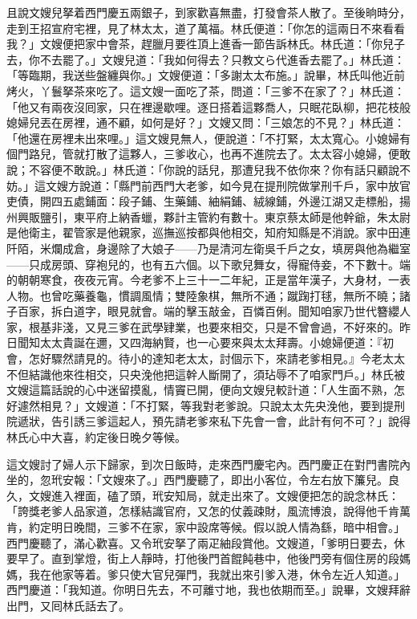 且說文嫂兒拏着西門慶五兩銀子，到家歡喜無盡，打發會茶人散了。至後晌時分，走到王招宣府宅裡，見了林太太，道了萬福。林氏便道：「你怎的這兩日不來看看我？」文嫂便把家中會茶，趕臘月要徃頂上進香一節告訴林氏。林氏道：「你兒子去，你不去罷了。」文嫂兒道：「我如何得去？只教文ら代進香去罷了。」林氏道：「等臨期，我送些盤纏與你。」文嫂便道：「多謝太太布施。」說畢，林氏叫他近前烤火，丫鬟拏茶來吃了。這文嫂一面吃了茶，問道：「三爹不在家了？」林氏道：「他又有兩夜沒囘家，只在裡邊歇哩。逐日搭着這夥喬人，只眠花臥柳，把花枝般媳婦兒丟在房裡，通不顧，如何是好？」文嫂又問：「三娘怎的不見？」林氏道：「他還在房裡未出來哩。」這文嫂見無人，便說道：「不打緊，太太寬心。小媳婦有個門路兒，管就打散了這夥人，三爹收心，也再不進院去了。太太容小媳婦，便敢說；不容便不敢說。」{}林氏道：「你說的話兒，那遭兒我不依你來？你有話只顧說不妨。」這文嫂方說道：「縣門前西門大老爹，如今見在提刑院做掌刑千戶，家中放官吏債，開四五處鋪面：段子鋪、生藥鋪、紬絹鋪、絨線鋪，外邊江湖又走標船，揚州興販鹽引，東平府上納香蠟，夥計主管約有數十。東京蔡太師是他幹爺，朱太尉是他衛主，翟管家是他親家，巡撫巡按都與他相交，知府知縣是不消說。家中田連阡陌，米爛成倉{}，身邊除了大娘子——乃是清河左衛吳千戶之女，填房與他為繼室——只成房頭、穿袍兒的，也有五六個。以下歌兒舞女，得寵侍妾，不下數十。端的朝朝寒食，夜夜元宵。今老爹不上三十一二年紀，正是當年漢子，大身材，一表人物。也曾吃藥養龜，慣調風情；{}雙陸象棋，無所不通；蹴踘打毬，無所不曉；諸子百家，拆白道字，眼見就會。端的擊玉敲金，百憐百俐。聞知咱家乃世代簪纓人家，根基非淺，又見三爹在武學肄業，也要來相交，只是不曾會過，不好來的。昨日聞知太太貴誕在邇，又四海納賢，{}也一心要來與太太拜壽。小媳婦便道：『初會，怎好驟然請見的。待小的達知老太太，討個示下，來請老爹相見。』今老太太不但結識他來徃相交，只央浼他把這幹人斷開了，須玷辱不了咱家門戶。」林氏被文嫂這篇話說的心中迷留摸亂，情竇已開，便向文嫂兒較計道：「人生面不熟，怎好遽然相見？」文嫂道：「不打緊，等我對老爹說。只說太太先央浼他，要到提刑院遞狀，告引誘三爹這起人，預先請老爹來私下先會一會，此計有何不可？」說得林氏心中大喜，約定後日晚夕等候。

這文嫂討了婦人示下歸家，到次日飯時，走來西門慶宅內。西門慶正在對門書院內坐的，忽玳安報：「文嫂來了。」西門慶聽了，即出小客位，令左右放下簾兒。良久，文嫂進入裡面，磕了頭，玳安知局，就走出來了。文嫂便把怎的說念林氏：「誇獎老爹人品家道，怎樣結識官府，又怎的仗義疎財，風流博浪，說得他千肯萬肯，約定明日晚間，三爹不在家，家中設席等候。假以說人情為繇，暗中相會。」西門慶聽了，滿心歡喜。又令玳安拏了兩疋紬段賞他。文嫂道，「爹明日要去，休要早了。直到掌燈，街上人靜時，打他後門首餛飩巷中{}，他後門旁有個住房的段媽媽，我在他家等着。爹只使大官兒彈門，我就出來引爹入港，休令左近人知道。」西門慶道：「我知道。你明日先去，不可離寸地，我也依期而至。」說畢，文嫂拜辭出門，又囘林氏話去了。

